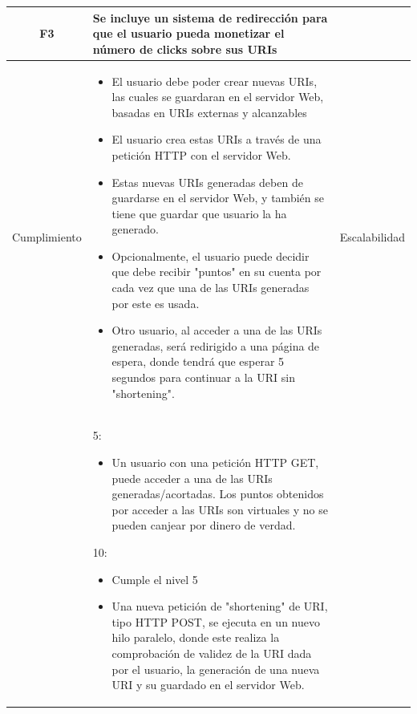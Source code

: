 \documentclass{article}
\begin{document}
 
\begin{table}[hbtp]
    \footnotesize
    \centering
    \settowidth{}
    \setlength\extrarowheight{5pt}
    \begin{tabulary}{\textwidth}{ C L }
        \textbf{F3} & Se incluye un sistema de redirección para que el usuario pueda monetizar el número de clicks sobre sus URIs
        \\
    \hline
    
    Cumplimiento &
    \begin{itemize}
        \item El usuario debe poder crear nuevas URIs, las cuales se guardaran en el servidor Web, basadas en URIs externas y alcanzables
 
        \item El usuario crea estas URIs a través de una petición HTTP con el servidor Web.
 
        \item Estas nuevas URIs generadas deben de guardarse en el servidor Web, y también se tiene que guardar que usuario la ha generado.
 
        \item Opcionalmente, el usuario puede decidir que debe recibir "puntos" en su cuenta por cada vez que una de las URIs generadas por este es usada.
 
        \item Otro usuario, al acceder a una de las URIs generadas, será redirigido a una página de espera, donde tendrá que esperar 5 segundos para continuar a la URI sin "shortening".
    \end{itemize} &
        
    Escalabilidad\\ &
    5:
    \begin{itemize}
        \item Un usuario con una petición HTTP GET, puede acceder a una de las URIs generadas/acortadas. Los puntos obtenidos por acceder a las URIs son virtuales y no se pueden canjear por dinero de verdad.
        
    \end{itemize} 
    10:
    \begin{itemize}
        \item Cumple el nivel 5
		
		\item Una nueva petición de "shortening" de URI, tipo HTTP POST, se ejecuta en un nuevo hilo paralelo, donde este realiza la comprobación de validez de la URI dada por el usuario, la generación de una nueva URI y su guardado en el servidor Web.
		

\end{itemize}
\end{tabulary}
\end{table}
\end{document}
